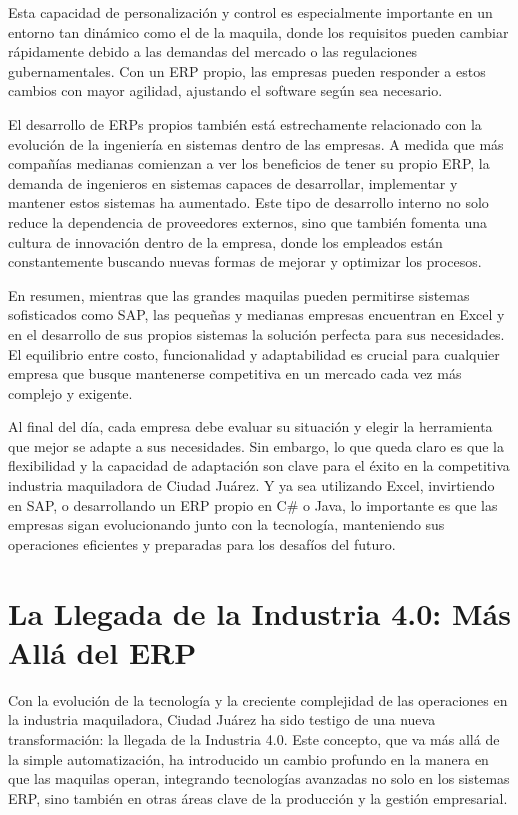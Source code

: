 \documentclass[
  10pt,
  letterpaper,
]{book}
\begin{document}
Esta capacidad de personalización y control es especialmente importante
en un entorno tan dinámico como el de la maquila, donde los requisitos
pueden cambiar rápidamente debido a las demandas del mercado o las
regulaciones gubernamentales. Con un ERP propio, las empresas pueden
responder a estos cambios con mayor agilidad, ajustando el software
según sea necesario.

El desarrollo de ERPs propios también está estrechamente relacionado con
la evolución de la ingeniería en sistemas dentro de las empresas. A
medida que más compañías medianas comienzan a ver los beneficios de
tener su propio ERP, la demanda de ingenieros en sistemas capaces de
desarrollar, implementar y mantener estos sistemas ha aumentado. Este
tipo de desarrollo interno no solo reduce la dependencia de proveedores
externos, sino que también fomenta una cultura de innovación dentro de
la empresa, donde los empleados están constantemente buscando nuevas
formas de mejorar y optimizar los procesos.

En resumen, mientras que las grandes maquilas pueden permitirse sistemas
sofisticados como SAP, las pequeñas y medianas empresas encuentran en
Excel y en el desarrollo de sus propios sistemas la solución perfecta
para sus necesidades. El equilibrio entre costo, funcionalidad y
adaptabilidad es crucial para cualquier empresa que busque mantenerse
competitiva en un mercado cada vez más complejo y exigente.

Al final del día, cada empresa debe evaluar su situación y elegir la
herramienta que mejor se adapte a sus necesidades. Sin embargo, lo que
queda claro es que la flexibilidad y la capacidad de adaptación son
clave para el éxito en la competitiva industria maquiladora de Ciudad
Juárez. Y ya sea utilizando Excel, invirtiendo en SAP, o desarrollando
un ERP propio en C\# o Java, lo importante es que las empresas sigan
evolucionando junto con la tecnología, manteniendo sus operaciones
eficientes y preparadas para los desafíos del futuro.

\section{La Llegada de la Industria 4.0: Más Allá del
ERP}\label{la-llegada-de-la-industria-4.0-muxe1s-alluxe1-del-erp}

Con la evolución de la tecnología y la creciente complejidad de las
operaciones en la industria maquiladora, Ciudad Juárez ha sido testigo
de una nueva transformación: la llegada de la Industria 4.0. Este
concepto, que va más allá de la simple automatización, ha introducido un
cambio profundo en la manera en que las maquilas operan, integrando
tecnologías avanzadas no solo en los sistemas ERP, sino también en otras
áreas clave de la producción y la gestión empresarial.
\end{document}
